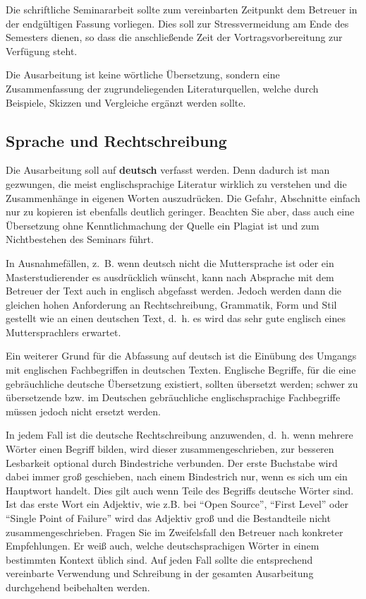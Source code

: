 \documentclass[final,bibliography=totocnumbered]{include/sikseminar}
\begin{document}
Die schriftliche Seminararbeit sollte zum vereinbarten Zeitpunkt dem Betreuer in der endgültigen Fassung vorliegen. Dies soll zur Stressvermeidung am Ende des Semesters dienen, so dass die anschließende Zeit der Vortragsvorbereitung zur Verfügung steht.

Die Ausarbeitung ist keine wörtliche Übersetzung, sondern eine Zusammenfassung der zugrundeliegenden Literaturquellen, welche durch Beispiele, Skizzen und Vergleiche ergänzt werden sollte.



\subsection{Sprache und Rechtschreibung}
Die Ausarbeitung soll auf \textbf{deutsch} verfasst werden. Denn dadurch ist man gezwungen, die meist englischsprachige Literatur wirklich zu verstehen und die Zusammenhänge in eigenen Worten auszudrücken. Die Gefahr, Abschnitte einfach nur zu kopieren ist ebenfalls deutlich geringer. Beachten Sie aber, dass auch eine Übersetzung ohne Kenntlichmachung der Quelle ein Plagiat ist und zum Nichtbestehen des Seminars führt.

In Ausnahmefällen, z.~B. wenn deutsch nicht die Muttersprache ist oder ein Masterstudierender es ausdrücklich wünscht, kann nach Absprache mit dem Betreuer der Text auch in englisch abgefasst werden. Jedoch werden dann die gleichen hohen Anforderung an Rechtschreibung, Grammatik, Form und Stil gestellt wie an einen deutschen Text, d.~h. es wird das sehr gute englisch eines Muttersprachlers erwartet.

Ein weiterer Grund für die Abfassung auf deutsch ist die Einübung des Umgangs mit englischen Fachbegriffen in deutschen Texten. Englische Begriffe, für die eine gebräuchliche deutsche Übersetzung existiert, sollten übersetzt werden; schwer zu übersetzende bzw. im Deutschen gebräuchliche englischsprachige Fachbegriffe müssen jedoch nicht ersetzt werden.

In jedem Fall ist die deutsche Rechtschreibung anzuwenden, d.~h. wenn mehrere Wörter einen Begriff bilden, wird dieser zusammengeschrieben, zur besseren Lesbarkeit optional durch Bindestriche verbunden. Der erste Buchstabe wird dabei immer groß geschieben, nach einem Bindestrich nur, wenn es sich um ein Hauptwort handelt. Dies gilt auch wenn Teile des Begriffs deutsche Wörter sind. Ist das erste Wort ein Adjektiv, wie z.B. bei ``Open Source'', ``First Level'' oder ``Single Point of Failure'' wird das Adjektiv groß und die Bestandteile nicht zusammengeschrieben. Fragen Sie im Zweifelsfall den Betreuer nach konkreter Empfehlungen. Er weiß auch, welche deutschsprachigen Wörter in einem bestimmten Kontext üblich sind. Auf jeden Fall sollte die entsprechend vereinbarte Verwendung und Schreibung in der gesamten Ausarbeitung durchgehend beibehalten werden.
\end{document}
